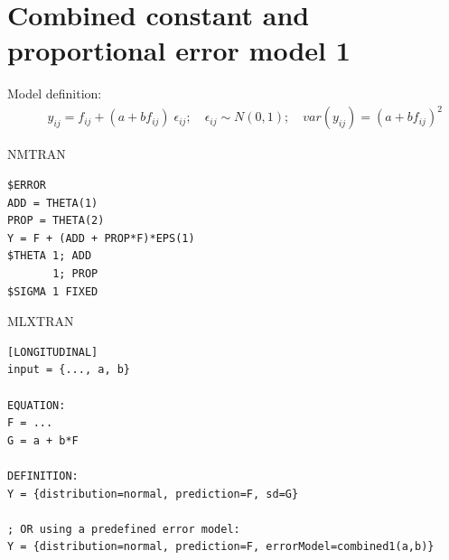 \section{Combined constant and proportional error model 1}
\label{model3}
Model definition:
\begin{eqnarray}
&& y_{ij} =  f_{ij} + (a + bf_{ij}) \; \epsilon_{ij}; \quad \epsilon_{ij} \sim N(0,1);\quad \mathit{var}(y_{ij}) = (a + bf_{ij})^2 \nonumber
\end{eqnarray}

\bigskip
\begin{lrbox}{\lstbox}\begin{minipage}{16cm}
NMTRAN
\begin{lstlisting}[frame=single,language=NM]
$ERROR
ADD = THETA(1)
PROP = THETA(2)
Y = F + (ADD + PROP*F)*EPS(1)
$THETA 1; ADD
	   1; PROP
$SIGMA 1 FIXED
\end{lstlisting}   
\end{minipage}\end{lrbox}
\usebox\lstbox


\begin{lrbox}{\lstbox}\begin{minipage}{16cm}
MLXTRAN
\begin{lstlisting}[frame=single,language=MLX]
[LONGITUDINAL]
input = {..., a, b}

EQUATION:
F = ...
G = a + b*F

DEFINITION:
Y = {distribution=normal, prediction=F, sd=G}

; OR using a predefined error model:
Y = {distribution=normal, prediction=F, errorModel=combined1(a,b)}
\end{lstlisting}   
\end{minipage}\end{lrbox}
\usebox\lstbox


